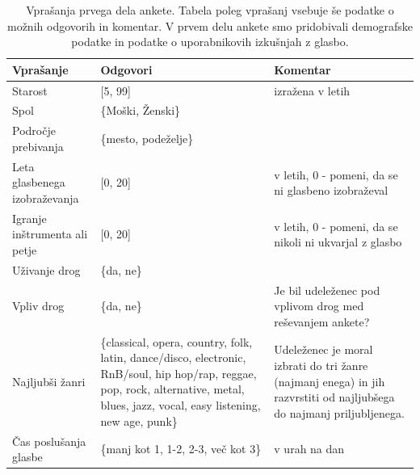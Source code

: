 \documentclass[a4paper, 12pt]{book}
\begin{document}
{\begin{table}[H]
\begin{center}
\caption{Vprašanja prvega dela ankete. Tabela poleg vprašanj vsebuje še podatke o možnih odgovorih in komentar. V prvem delu ankete smo pridobivali demografske podatke in podatke o uporabnikovih izkušnjah z glasbo.}
\begin{tabular}{| p{3.5cm} | p{4.5cm} | p{4.5cm} |}
\hline
Vprašanje & Odgovori & Komentar \\ \hline \hline
Starost & [5, 99] & izražena v letih \\ \hline
Spol & \{Moški, Ženski\} & \\ \hline
Področje prebivanja & \{mesto, podeželje\} & \\ \hline
Leta glasbenega izobraževanja & [0, 20] & v letih, 0 - pomeni, da se ni glasbeno izobraževal \\ \hline
Igranje inštrumenta ali petje & [0, 20] & v letih, 0 - pomeni, da se nikoli ni ukvarjal z glasbo \\ \hline
Uživanje drog & \{da, ne\} & \\ \hline
Vpliv drog & \{da, ne\} &  Je bil udeleženec pod vplivom drog med reševanjem ankete? \\ \hline
Najljubši žanri & \{classical, opera, country, folk, latin, dance/disco, electronic, RnB/soul, hip hop/rap, reggae, pop, rock, alternative, metal, blues, jazz, vocal, easy listening, new age, punk\} & Udeleženec je moral izbrati do tri žanre (najmanj enega) in jih razvrstiti od najljubšega do najmanj priljubljenega. \\ \hline
Čas poslušanja glasbe & \{manj kot 1, 1-2, 2-3, več kot 3\} & v urah na dan \\ \hline

\end{tabular}
\label{prvidel}
\end{center}
\end{table} 

}
\end{document}
